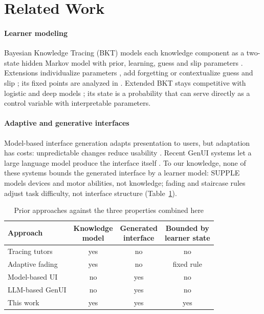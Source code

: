 \documentclass[conference]{IEEEtran}
\begin{document}
\section{Related Work}

\paragraph*{Learner modeling}
Bayesian Knowledge Tracing (BKT) models each knowledge component as a
two-state hidden Markov model with prior, learning, guess and slip parameters
\cite{corbett1995knowledge}. Extensions individualize parameters
\cite{pardos2010individualization}, add forgetting \cite{khajah2016deep} or
contextualize guess and slip \cite{baker2008contextual}; its fixed points are
analyzed in \cite{vandesande2013properties}. Extended BKT stays competitive
with logistic and deep models \cite{pelanek2017bkt,khajah2016deep}; its state
is a probability that can serve directly as a control variable with interpretable
parameters.

\paragraph*{Adaptive and generative interfaces}
Model-based interface generation \cite{gajos2010supple} adapts presentation to users, but
adaptation has costs: unpredictable changes reduce usability
\cite{gajos2008predictability,findlater2004menus}. Recent GenUI
systems let a large language model produce the interface itself
\cite{leviathan2026genui,tu2026maicui}. To our knowledge, none of these
systems bounds the generated interface by a learner model: SUPPLE models devices and
motor abilities, not knowledge; fading and staircase rules
\cite{salden2010expertise,levitt1971updown} adjust task difficulty, not interface structure (Table~\ref{tab:related}).

\begin{table}[t]
\caption{Prior approaches against the three properties combined here}
\label{tab:related}
\centering\footnotesize
\setlength{\tabcolsep}{3pt}
\begin{tabular}{@{}lccc@{}}
\toprule
Approach & \makecell{Knowledge\\model} & \makecell{Generated\\interface} & \makecell{Bounded by\\learner state}\\
\midrule
Tracing tutors \cite{corbett1995knowledge,ritter2007cognitive} & yes & no & no\\
Adaptive fading \cite{salden2010expertise} & yes & no & fixed rule\\
Model-based UI \cite{gajos2010supple} & no & yes & no\\
LLM-based GenUI \cite{leviathan2026genui,tu2026maicui} & no & yes & no\\
This work & yes & yes & yes\\
\bottomrule
\end{tabular}
\end{table}
\end{document}
